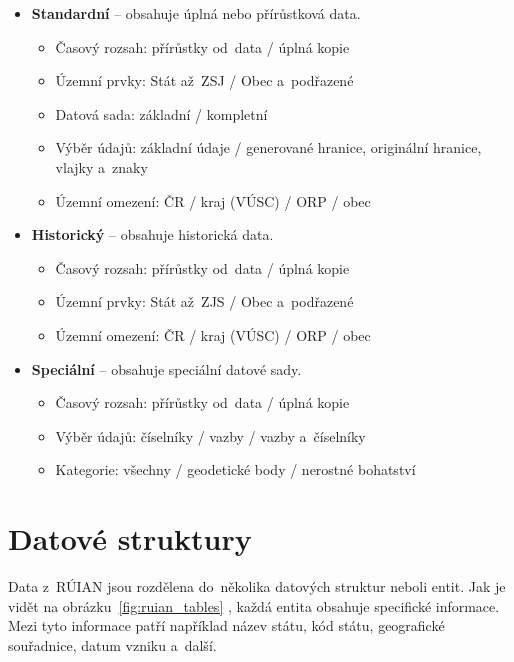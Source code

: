 \begin{itemize}
    \item \textbf{Standardní} -- obsahuje úplná nebo přírůstková data.
    \begin{itemize}[itemsep=0pt]
        \item Časový rozsah: přírůstky od~data / úplná kopie
        \item Územní prvky: Stát až~ZSJ / Obec a~podřazené
        \item Datová sada: základní / kompletní
        \item Výběr údajů: základní údaje / generované hranice, originální hranice, vlajky a~znaky
        \item Územní omezení: ČR / kraj (VÚSC) / ORP / obec
    \end{itemize}

    \item \textbf{Historický} -- obsahuje historická data.
    \begin{itemize}[itemsep=0pt]
        \item Časový rozsah: přírůstky od~data / úplná kopie
        \item Územní prvky: Stát až~ZJS / Obec a~podřazené
        \item Územní omezení: ČR / kraj (VÚSC) / ORP / obec
    \end{itemize}

    \item \textbf{Speciální} -- obsahuje speciální datové sady.
    \begin{itemize}[itemsep=0pt]
        \item Časový rozsah: přírůstky od~data / úplná kopie
        \item Výběr údajů: číselníky / vazby / vazby a~číselníky
        \item Kategorie: všechny / geodetické body / nerostné bohatství
    \end{itemize}
\end{itemize}

\section{Datové struktury}
Data z~RÚIAN jsou rozdělena do~několika datových struktur neboli entit. 
Jak je vidět na obrázku~\ref{fig:ruian_tables} \cite{ruian_vfr}, každá entita obsahuje specifické informace. 
Mezi tyto informace patří například název státu, kód státu, geografické souřadnice, datum vzniku a~další. 

